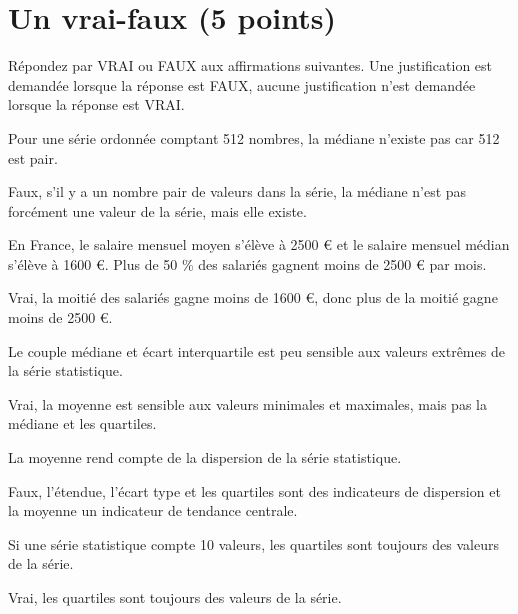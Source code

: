 \section{Un vrai-faux (5 points)}

Répondez par VRAI ou FAUX aux affirmations suivantes. Une justification est demandée lorsque la réponse est FAUX, aucune justification n'est demandée lorsque la réponse est VRAI.

\begin{questions}
	\question[1] Pour une série ordonnée comptant 512 nombres, la médiane n'existe pas car 512 est pair.
	\begin{solution}
		Faux, s'il y a un nombre pair de valeurs dans la série, la médiane n'est pas forcément une valeur de la série, mais elle existe.
	\end{solution}
	
	\question[1] En France, le salaire mensuel moyen s'élève à \num{2500} € et le salaire mensuel médian s'élève à \num{1600} €. Plus de 50 \% des salariés gagnent moins de \num{2500} € par mois.
	\begin{solution}
		Vrai, la moitié des salariés gagne moins de \num{1600} €, donc plus de la moitié gagne moins de \num{2500} €.
	\end{solution}
	
	\question[1] Le couple médiane et écart interquartile est peu sensible aux valeurs extrêmes de la série statistique.
	\begin{solution}
		Vrai, la moyenne est sensible aux valeurs minimales et maximales, mais pas la médiane et les quartiles.
	\end{solution}
	
	\question[1] La moyenne rend compte de la dispersion de la série statistique.
	\begin{solution}
		Faux, l'étendue, l'écart type et les quartiles sont des indicateurs de dispersion et la moyenne un indicateur de tendance centrale.
	\end{solution}
	
	\question[1] Si une série statistique compte 10 valeurs, les quartiles sont toujours des valeurs de la série.
	\begin{solution}
		Vrai, les quartiles sont toujours des valeurs de la série.
	\end{solution}
	
\end{questions}